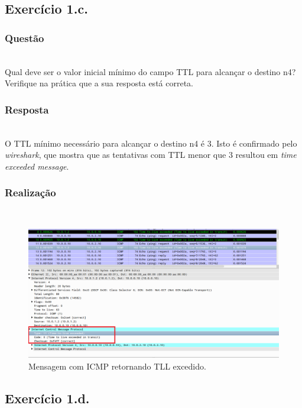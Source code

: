 \documentclass{llncs}
\begin{document}
\subsection{Exercício 1.c.}
\subsubsection{Questão}\rule[-10pt]{0pt}{10pt}\\

Qual deve ser o valor inicial mínimo do campo TTL para alcançar o destino n4? Verifique na prática que a sua resposta está correta.

\subsubsection{Resposta}\rule[-10pt]{0pt}{10pt}\\

O TTL mínimo necessário para alcançar o destino n4 é 3. Isto é confirmado pelo \textit{wireshark}, que mostra que as tentativas com TTL menor que 3 resultou em \textit{time exceeded message}.

\subsubsection{Realização}\rule[-10pt]{0pt}{10pt}\\
\begin{figure}
	\begin{center}
	\includegraphics[scale=0.35]{imagens/ttlexceededmessage.png} 
	\end{center}
	\caption{\label{fig:ip_source}Mensagem com ICMP retornando TLL excedido.}
\end{figure} 

\subsection{Exercício 1.d.}
\end{document}
